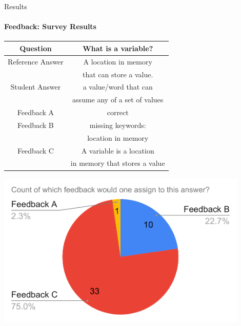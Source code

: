 \documentclass[aspectratio=169]{beamer}
\begin{document}
\begin{frame}{Results}
\framesubtitle{Feedback: Survey Results}
\begin{table}
	\begin{tabular}{ |c|c| }
		\hline
		Question & What is a variable?  
		\\ \hline 
		Reference Answer & A location in memory\\& that can store a value.
		\\ \hline
		Student Answer & a value/word that can\\& assume any of a set of values
		\\ \hline
		Feedback A & correct
		\\ \hline
		Feedback B & missing keywords:\\& location in memory
		\\ \hline
		Feedback C & A variable is a location\\& in memory that stores a value
		\\ \hline
	\end{tabular}
\end{table}
\end{frame}
\begin{frame}
\begin{center}
\includegraphics[width=0.9\textwidth]{images/survey_1.pdf}
\end{center}
\end{frame}
\end{document}
